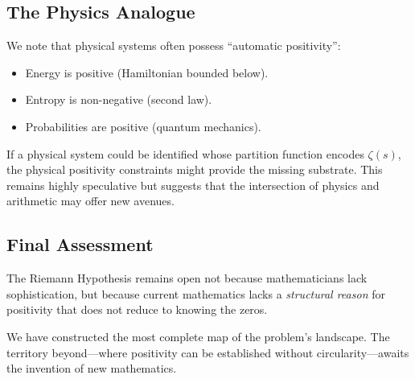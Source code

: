 \documentclass[12pt, a4paper]{article}
\theoremstyle{definition}
\begin{document}
\subsection{The Physics Analogue}

We note that physical systems often possess ``automatic positivity'':
\begin{itemize}
\item Energy is positive (Hamiltonian bounded below).
\item Entropy is non-negative (second law).
\item Probabilities are positive (quantum mechanics).
\end{itemize}

If a physical system could be identified whose partition function encodes $\zeta(s)$, the physical positivity constraints might provide the missing substrate. This remains highly speculative but suggests that the intersection of physics and arithmetic may offer new avenues.

\subsection{Final Assessment}

The Riemann Hypothesis remains open not because mathematicians lack sophistication, but because current mathematics lacks a \textit{structural reason} for positivity that does not reduce to knowing the zeros.

We have constructed the most complete map of the problem's landscape. The territory beyond---where positivity can be established without circularity---awaits the invention of new mathematics.
\end{document}
